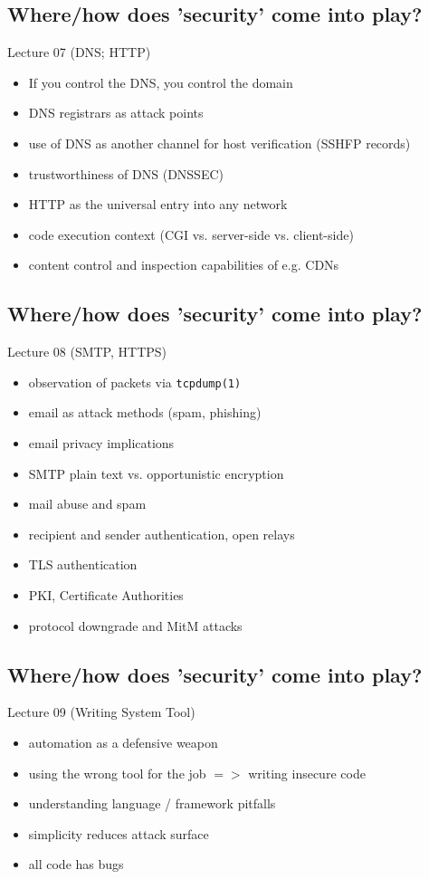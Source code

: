 \documentclass[xga]{xdvislides}
\begin{document}
\subsection{Where/how does 'security' come into play?}
Lecture 07 (DNS; HTTP)
\begin{itemize}
	\item If you control the DNS, you control the domain
	\item DNS registrars as attack points
	\item use of DNS as another channel for host verification (SSHFP records)
	\item trustworthiness of DNS (DNSSEC)
	\item HTTP as the universal entry into any network
	\item code execution context (CGI vs. server-side vs. client-side)
	\item content control and inspection capabilities of e.g. CDNs
\end{itemize}

\subsection{Where/how does 'security' come into play?}
Lecture 08 (SMTP, HTTPS)
\begin{itemize}
	\item observation of packets via {\tt tcpdump(1)}
	\item email as attack methods (spam, phishing)
	\item email privacy implications
	\item SMTP plain text vs. opportunistic encryption
	\item mail abuse and spam
	\item recipient and sender authentication, open relays
	\item TLS authentication
	\item PKI, Certificate Authorities
	\item protocol downgrade and MitM attacks
\end{itemize}

\subsection{Where/how does 'security' come into play?}
Lecture 09 (Writing System Tool)
\begin{itemize}
	\item automation as a defensive weapon
	\item using the wrong tool for the job $=>$ writing insecure code
	\item understanding language / framework pitfalls
	\item simplicity reduces attack surface
	\item all code has bugs
\end{itemize}
\vspace{.5in}
\end{document}
